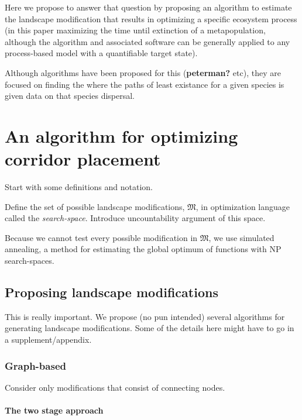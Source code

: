 \documentclass[10pt,oneside]{article}
\begin{document}
Here we propose to answer that question by proposing an algorithm to
estimate the landscape modification that results in optimizing a
specific ecosystem process (in this paper maximizing the time until
extinction of a metapopulation, although the algorithm and associated
software can be generally applied to any process-based model with a
quantifiable target state).

Although algorithms have been proposed for this (\textbf{peterman?}
etc), they are focused on finding the where the paths of least existance
for a given species is given data on that species dispersal.

\hypertarget{an-algorithm-for-optimizing-corridor-placement}{%
\section{An algorithm for optimizing corridor
placement}\label{an-algorithm-for-optimizing-corridor-placement}}

Start with some definitions and notation.

Define the set of possible landscape modifications, \(\mathfrak{M}\), in
optimization language called the \emph{search-space}. Introduce
uncountability argument of this space.

Because we cannot test every possible modification in \(\mathfrak{M}\),
we use simulated annealing, a method for estimating the global optimum
of functions with NP search-spaces.

\hypertarget{proposing-landscape-modifications}{%
\subsection{Proposing landscape
modifications}\label{proposing-landscape-modifications}}

This is really important. We propose (no pun intended) several
algorithms for generating landscape modifications. Some of the details
here might have to go in a supplement/appendix.

\hypertarget{graph-based}{%
\subsubsection{Graph-based}\label{graph-based}}

Consider only modifications that consist of connecting nodes.

\hypertarget{the-two-stage-approach}{%
\paragraph{The two stage approach}\label{the-two-stage-approach}}
\end{document}
